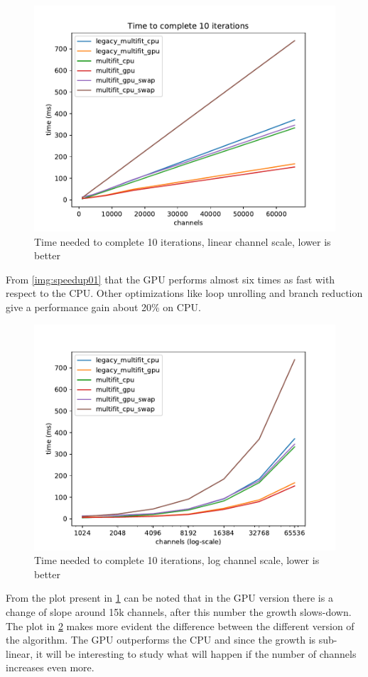 \begin{figure}[H]
  \includegraphics[width=.75\textwidth]{img/linscale}
  \caption{Time needed to complete 10 iterations, linear channel scale, lower is better}
  \label{img:linscale01}
\end{figure}
From \ref{img:speedup01} that the GPU performs almost six times as fast with respect to the CPU. Other optimizations like loop unrolling and branch reduction give a performance gain about 20\% on CPU.
\begin{figure}[H]
  \includegraphics[width=.75\textwidth]{img/logscale}
  \caption{Time needed to complete 10 iterations, log channel scale, lower is better}
  \label{img:logscale01}
\end{figure}
From the plot present in \ref{img:linscale01} can be noted that in the GPU version there is a change of slope around 15k channels, after this number the growth slows-down.
The plot in \ref{img:logscale01} makes more evident the difference between the different version of the algorithm. The GPU outperforms the CPU and since the growth is sub-linear, it will be interesting to study what will happen if the number of channels increases even more.\\
